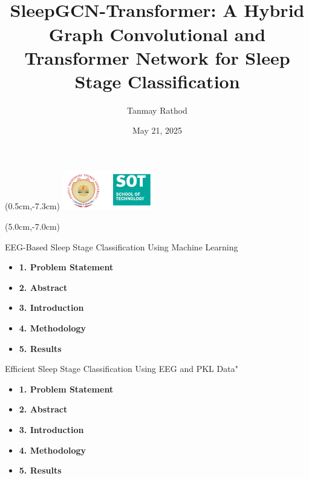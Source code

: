\documentclass [aspectratio=169]{beamer}
\title[]{\vspace{60pt} \\
SleepGCN-Transformer: A Hybrid Graph Convolutional and Transformer Network for Sleep Stage Classification} %
\author[]{Tanmay Rathod }
\date{May 21, 2025}
\begin{document}
{
\begin{frame}
    \titlepage
    \begin{textblock*}{4cm}(0.5cm,-7.3cm)
        \includegraphics[width=4cm]{pdpu logo-.png}
    \end{textblock*}
    \begin{textblock*}{8cm}(5.0cm,-7.0cm)
        \huge {} %
    \end{textblock*}
\end{frame}
}





\begin{frame}{EEG-Based Sleep Stage Classification Using Machine Learning}
	
	\begin{block}{}
		\begin{itemize}
			\item \textbf{1. Problem Statement}
			\item \textbf{2. Abstract}
			\item \textbf{3. Introduction}
			\item \textbf{4. Methodology}
			\item \textbf{5. Results}


		\end{itemize}
	\end{block}
\end{frame}












\begin{frame}{Efficient Sleep Stage Classification Using EEG and PKL Data"}
	
	\begin{block}{}
		\begin{itemize}
			\item \textbf{1. Problem Statement}
			\item \textbf{2. Abstract}
			\item \textbf{3. Introduction}
			\item \textbf{4. Methodology}
			\item \textbf{5. Results}


		\end{itemize}
	\end{block}
\end{frame}
\end{document}
